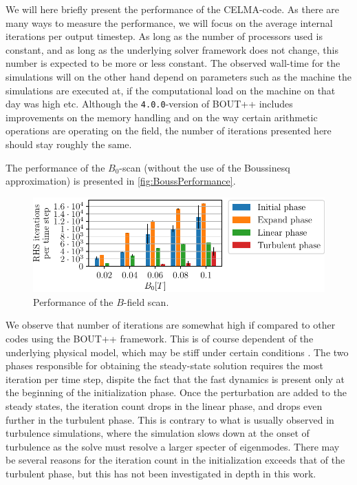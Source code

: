 %
We will here briefly present the performance of the CELMA-code.
As there are many ways to measure the performance, we will focus on the average internal iterations per output timestep.
As long as the number of processors used is constant, and as long as the underlying solver framework does not change, this number is expected to be more or less constant.
The observed wall-time for the simulations will on the other hand depend on parameters such as the machine the simulations are executed at, if the computational load on the machine on that day was high etc.
Although the \texttt{4.0.0}-version of BOUT++ includes improvements on the memory handling and on the way certain arithmetic operations are operating on the field, the number of iterations presented here should stay roughly the same.

The performance of the $B_0$-scan (without the use of the Boussinesq approximation) is presented in \cref{fig:BoussPerformance}.
%
\begin{figure}[htb]
    \centering
    \includegraphics{fig/results/performance/RHSEvalsPerTimeBScan}
    \caption{Performance of the $B$-field scan.}
    \label{fig:BPerformance}
\end{figure}
%
We observe that number of iterations are somewhat high if compared to other codes using the BOUT++ framework.
This is of course dependent of the underlying physical model, which may be stiff under certain conditions \cite{Leveque2007book}.
The two phases responsible for obtaining the steady-state solution requires the most iteration per time step, dispite the fact that the fast dynamics is present only at the beginning of the initialization phase.
Once the perturbation are added to the steady states, the iteration count drops in the linear phase, and drops even further in the turbulent phase.
This is contrary to what is usually observed in turbulence simulations, where the simulation slows down at the onset of turbulence as the solve must resolve a larger specter of eigenmodes.
There may be several reasons for the iteration count in the initialization exceeds that of the turbulent phase, but this has not been investigated in depth in this work.
